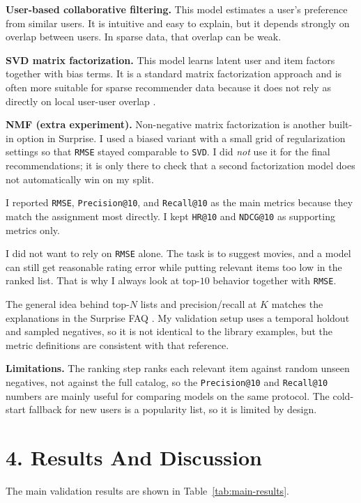 \documentclass[10pt,a4paper]{article}
\begin{document}
\textbf{User-based collaborative filtering.} This model estimates a user's preference from similar users. It is intuitive and easy to explain, but it depends strongly on overlap between users. In sparse data, that overlap can be weak.

\textbf{SVD matrix factorization.} This model learns latent user and item factors together with bias terms. It is a standard matrix factorization approach and is often more suitable for sparse recommender data because it does not rely as directly on local user-user overlap \cite{koren2009,surprise-svd}.

\textbf{NMF (extra experiment).} Non-negative matrix factorization is another built-in option in Surprise. I used a biased variant with a small grid of regularization settings so that \texttt{RMSE} stayed comparable to \texttt{SVD}. I did \emph{not} use it for the final recommendations; it is only there to check that a second factorization model does not automatically win on my split.

I reported \texttt{RMSE}, \texttt{Precision@10}, and \texttt{Recall@10} as the main metrics because they match the assignment most directly. I kept \texttt{HR@10} and \texttt{NDCG@10} as supporting metrics only.

I did not want to rely on \texttt{RMSE} alone. The task is to suggest movies, and a model can still get reasonable rating error while putting relevant items too low in the ranked list. That is why I always look at top-$10$ behavior together with \texttt{RMSE}.

The general idea behind top-$N$ lists and precision/recall at $K$ matches the explanations in the Surprise FAQ \cite{surprise-faq}. My validation setup uses a temporal holdout and sampled negatives, so it is not identical to the library examples, but the metric definitions are consistent with that reference.

\textbf{Limitations.} The ranking step ranks each relevant item against random unseen negatives, not against the full catalog, so the \texttt{Precision@10} and \texttt{Recall@10} numbers are mainly useful for comparing models on the same protocol. The cold-start fallback for new users is a popularity list, so it is limited by design.

\section*{4. Results And Discussion}
The main validation results are shown in Table~\ref{tab:main-results}.
\end{document}

